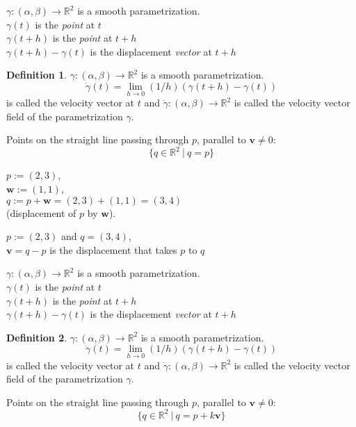 \documentclass[twocolumn,20pt,fleqn]{extarticle}
\newcommand{\sep}{\vspace{0.5cm}}
\theoremstyle{plain}
\theoremstyle{definition}
\newtheorem*{definition}{Definition}
\theoremstyle{remark}
\begin{document}
$\gamma : (\alpha,\beta) \to \mathbb{R}^2$ is a smooth parametrization.\\
$\gamma(t)$ is the \emph{point} at $t$\\
$\gamma(t+h)$ is the \emph{point} at $t+h$\\
$\gamma(t+h)-\gamma(t)$ is the displacement \emph{vector} at $t+h$\\



\begin{definition}
$\gamma : (\alpha,\beta) \to \mathbb{R}^2$ is a smooth parametrization.
\[\dot{\gamma}(t) = \lim_{h\to 0} (1/h)(\gamma(t+h) - \gamma(t))\]
is called the velocity vector at $t$ and $\dot{\gamma} : (\alpha, \beta) \to \mathbb{R}^2$ is called the velocity vector field of the parametrization $\gamma$.
\end{definition}
\newpage
Points on the straight line passing through $p$, parallel to $\mathbf{v}\neq 0$:
\[\{q \in \mathbb{R}^2 \ |\ q = p \}\]


\clearpage



$p := (2,3)$,\\ $\mathbf{w} := (1,1)$,\\ $q:=p + \mathbf{w} = (2,3) + (1,1) = (3,4)$ \\ (displacement of $p$ by $\mathbf{w}$).

\sep
$p := (2,3)$ and $q=(3,4)$,\\
$\mathbf{v}= q - p$ is the displacement that takes $p$ to $q$ 
\sep

$\gamma : (\alpha,\beta) \to \mathbb{R}^2$ is a smooth parametrization.\\
$\gamma(t)$ is the \emph{point} at $t$\\
$\gamma(t+h)$ is the \emph{point} at $t+h$\\
$\gamma(t+h)-\gamma(t)$ is the displacement \emph{vector} at $t+h$\\



\begin{definition}
$\gamma : (\alpha,\beta) \to \mathbb{R}^2$ is a smooth parametrization.
\[\dot{\gamma}(t) = \lim_{h\to 0} (1/h)(\gamma(t+h) - \gamma(t))\]
is called the velocity vector at $t$ and $\dot{\gamma} : (\alpha, \beta) \to \mathbb{R}^2$ is called the velocity vector field of the parametrization $\gamma$.
\end{definition}
\newpage
Points on the straight line passing through $p$, parallel to $\mathbf{v}\neq 0$:
\[\{q \in \mathbb{R}^2 \ |\ q = p  + k\mathbf{v} \}\]
\end{document}
